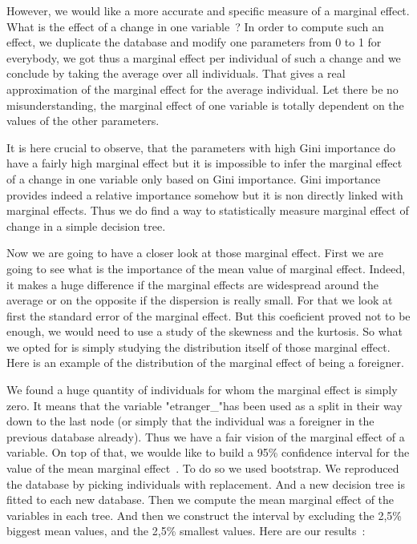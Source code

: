 

However, we would like a more accurate and specific measure of a marginal effect. What is the effect of a change in one variable ?
In order to compute such an effect, we duplicate the database and modify one parameters from 0 to 1 for everybody, we got thus a marginal effect per individual of such a change and we conclude by taking the average over all individuals. That gives a real approximation of the marginal  effect for the average individual. Let there be no misunderstanding, the marginal effect of one variable is totally dependent on the values of the other parameters.




It is here crucial to observe, that the parameters with high Gini importance do have a fairly high marginal effect but it is impossible to infer the marginal effect of a change in one variable only based on Gini importance. Gini importance provides indeed a relative importance somehow but it is non directly linked with marginal effects.
Thus we do find a way to statistically measure marginal effect of change in a simple decision tree.

Now we are going to have a closer look at those marginal effect.
First we are going to see what is the importance of the mean value of marginal effect. Indeed, it makes a huge difference if the marginal effects are widespread around the average or on the opposite if the dispersion is really small.
For that we look at first the standard error of the marginal effect. But this coeficient proved not to be enough, we would need to use a study of the skewness and the kurtosis. So what we opted for is simply studying the distribution itself of those marginal effect.
Here is an example of the distribution of the marginal effect of being a foreigner.



We found a huge quantity of individuals for whom the marginal effect is simply zero. It means that the variable "etranger\_"has been used as a split in their way down to the last node (or simply that the individual was a foreigner in the previous database already).
Thus we have a fair vision of the marginal effect of a variable.
On top of that, we woulde like to build a 95\% confidence interval for the value of the mean marginal effect . To do so we used bootstrap. We reproduced the database by picking individuals with replacement. And a new decision tree is fitted to each new database. Then we compute the mean marginal effect of the variables in each tree. And then we construct the interval by excluding the 2,5\% biggest mean values, and the 2,5\% smallest values.
Here are our results :

